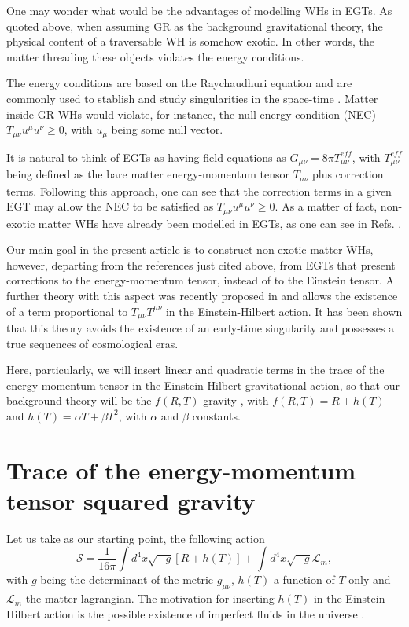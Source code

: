 \documentclass[twocolumn,showpacs,aps,amssymb,floatfix,prd,amsmath,preprintnumbers]{revtex4}
\begin{document}
One may wonder what would be the advantages of modelling WHs in EGTs. As quoted above, when assuming GR as the background gravitational theory, the physical content of a traversable WH is somehow exotic. In other words, the matter threading these objects violates the energy conditions. 

The energy conditions are based on the Raychaudhuri equation and are commonly used to stablish and study singularities in the space-time \cite{visser/1995}. Matter inside GR WHs would violate, for instance, the null energy condition (NEC) $T_{\mu\nu}u^\mu u^\nu\geq0$, with $u_{\mu}$ being some null vector.

It is natural to think of EGTs as having field equations as $G_{\mu\nu}=8\pi T_{\mu\nu}^{eff}$, with $T_{\mu\nu}^{eff}$ being defined as the bare matter energy-momentum tensor $T_{\mu\nu}$ plus correction terms. Following this approach, one can see that the correction terms in a given EGT may allow the NEC to be satisfied as $T_{\mu\nu}u^\mu u^\nu\geq0$. As a matter of fact,  non-exotic matter WHs have already been modelled in EGTs, as one can see in Refs. \cite{harko/2013,mazhamirousavi/2016,hohmann/2014}.

Our main goal in the present article is to construct non-exotic matter WHs, however, departing from the references just cited above, from EGTs that present corrections to the energy-momentum tensor, instead of to the Einstein tensor. A further theory with this aspect was recently proposed in \cite{roshan/2016} and allows the existence of a term proportional to $T_{\mu\nu}T^{\mu\nu}$ in the Einstein-Hilbert action. It has been shown that this theory avoids the existence of an early-time singularity and possesses a true sequences of cosmological eras.

Here, particularly, we will insert linear and quadratic terms in the trace of the energy-momentum tensor in the Einstein-Hilbert gravitational action, so that our background theory will be the $f(R,T)$ gravity \cite{harko/2011}, with $f(R,T)=R+h(T)$ and $h(T)=\alpha T+\beta T^{2}$, with $\alpha$ and $\beta$ constants. 

\section{Trace of the energy-momentum tensor squared gravity}\label{sec:sg} 

Let us take as our starting point, the following action 
\begin{equation}\label{sg1}
\mathcal{S}=\frac{1}{16\pi}\int d^{4}x\sqrt{-g}[R+h(T)]+\int d^{4}x\sqrt{-g}\mathcal{L}_m,
\end{equation}
with $g$ being the determinant of the metric $g_{\mu\nu}$, $h(T)$ a function of $T$ only and $\mathcal{L}_m$ the matter lagrangian. The motivation for inserting $h(T)$ in the Einstein-Hilbert action is the possible existence of imperfect fluids in the universe \cite{harko/2011}.
\end{document}
